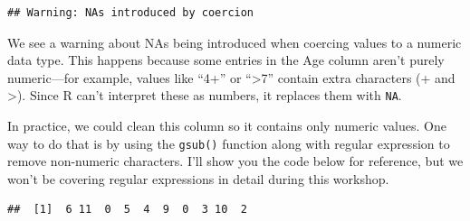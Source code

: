 \documentclass[
]{book}
\newenvironment{Shaded}{\begin{snugshade}}{\end{snugshade}}
\newcommand{\AttributeTok}[1]{\textcolor[rgb]{0.13,0.29,0.53}{#1}}
\newcommand{\CommentTok}[1]{\textcolor[rgb]{0.56,0.35,0.01}{\textit{#1}}}
\newcommand{\DecValTok}[1]{\textcolor[rgb]{0.00,0.00,0.81}{#1}}
\newcommand{\FunctionTok}[1]{\textcolor[rgb]{0.13,0.29,0.53}{\textbf{#1}}}
\newcommand{\NormalTok}[1]{#1}
\newcommand{\OtherTok}[1]{\textcolor[rgb]{0.56,0.35,0.01}{#1}}
\newcommand{\SpecialCharTok}[1]{\textcolor[rgb]{0.81,0.36,0.00}{\textbf{#1}}}
\newcommand{\StringTok}[1]{\textcolor[rgb]{0.31,0.60,0.02}{#1}}
\begin{document}
\begin{verbatim}
## Warning: NAs introduced by coercion
\end{verbatim}

\begin{Shaded}
\end{Shaded}

We see a warning about NAs being introduced when coercing values to a numeric data type. This happens because some entries in the Age column aren't purely numeric---for example, values like ``4+'' or ``\textgreater7'' contain extra characters (+ and \textgreater). Since R can't interpret these as numbers, it replaces them with \texttt{NA}.

In practice, we could clean this column so it contains only numeric values. One way to do that is by using the \texttt{gsub()} function along with regular expression to remove non-numeric characters. I'll show you the code below for reference, but we won't be covering regular expressions in detail during this workshop.

\begin{Shaded}
\end{Shaded}

\begin{verbatim}
##  [1]  6 11  0  5  4  9  0  3 10  2
\end{verbatim}

\begin{Shaded}
\end{Shaded}
\end{document}
